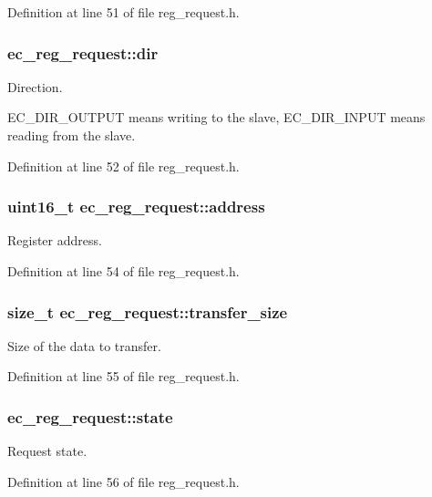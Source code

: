 \-Definition at line 51 of file reg\-\_\-request.\-h.

\subsubsection[{dir}]{ {\bf ec\-\_\-reg\-\_\-request\-::dir}}\label{structec__reg__request_ac9e44c1d65dd892c66d1a4f2a4427e48}


\-Direction. 

\-E\-C\-\_\-\-D\-I\-R\-\_\-\-O\-U\-T\-P\-U\-T means writing to the slave, \-E\-C\-\_\-\-D\-I\-R\-\_\-\-I\-N\-P\-U\-T means reading from the slave. 

\-Definition at line 52 of file reg\-\_\-request.\-h.

\subsubsection[{address}]{\setlength{\rightskip}{0pt plus 5cm}uint16\-\_\-t {\bf ec\-\_\-reg\-\_\-request\-::address}}\label{structec__reg__request_aa6f44f4a9851e291726cbc92f7c099fa}


\-Register address. 



\-Definition at line 54 of file reg\-\_\-request.\-h.

\subsubsection[{transfer\-\_\-size}]{\setlength{\rightskip}{0pt plus 5cm}size\-\_\-t {\bf ec\-\_\-reg\-\_\-request\-::transfer\-\_\-size}}\label{structec__reg__request_ae8a1e21e4dfa24c3c0878649f33f4de9}


\-Size of the data to transfer. 



\-Definition at line 55 of file reg\-\_\-request.\-h.

\subsubsection[{state}]{ {\bf ec\-\_\-reg\-\_\-request\-::state}}\label{structec__reg__request_adfba6eddfd79740eae02362347093120}


\-Request state. 



\-Definition at line 56 of file reg\-\_\-request.\-h.


